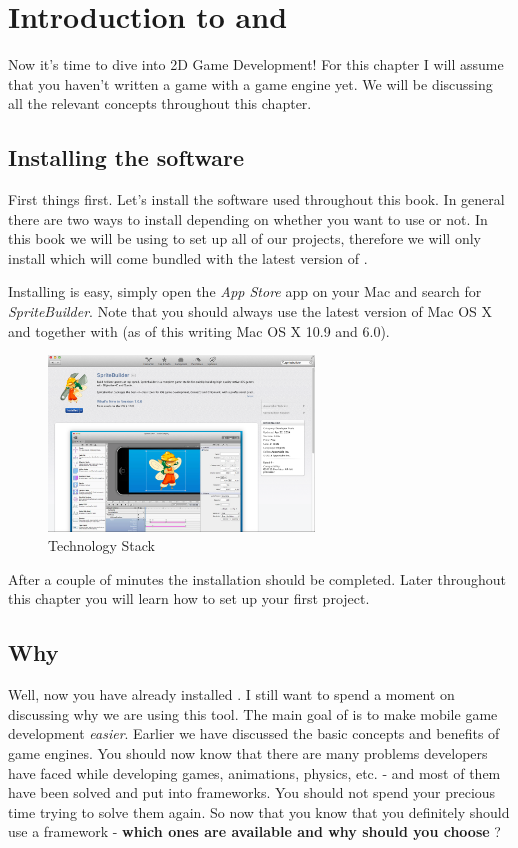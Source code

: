 \chapter{Introduction to \SB{} and \cocos{} }
Now it's time to dive into 2D Game Development! For this chapter I will assume
that you haven't written a game with a game engine yet. We will be discussing
all the relevant concepts throughout this chapter.

\section{Installing the software}
First things first. Let's install the software used throughout this book.
In general there are two ways to install \cocos{} depending on whether you want
to use \SB{} or not. In this book we will be using \SB{} to set up all
of our projects, therefore we will only install \SB{} which will come bundled
with the latest version of \cocos{}. 

Installing \SB{} is easy, simply open the \textit{App Store} app on your Mac and
search for \textit{SpriteBuilder}. Note that you should always use the latest
version of Mac OS X and \xcode{} together with \SB{} (as of this writing Mac
OS X 10.9 and \xcode{} 6.0).

\begin{figure}[H] 
		\centering
		\includegraphics[width=200pt]{images/cocos2d/setup/mac_appstore_install.png}     
		\caption{\cocos{} Technology Stack}
\end{figure}

After a couple of minutes the \SB{} installation should be completed. Later
throughout this chapter you will learn how to set up your first project.

\section{Why \cocos{}}
Well, now you have already installed \cocos{}. I still want to spend a moment on
discussing why we are using this tool. The main goal of \cocos{} is to make
mobile game development \textit{easier}. Earlier we have discussed the basic
concepts and benefits of game engines. You should now know that there are many
problems developers have faced while developing games, animations, physics, etc.
- and most of them have been solved and put into frameworks. You should not
spend your precious time trying to solve them again. So now that you know that
you definitely should use a framework - \textbf{which ones are available and why
should you choose \cocos{}}?

